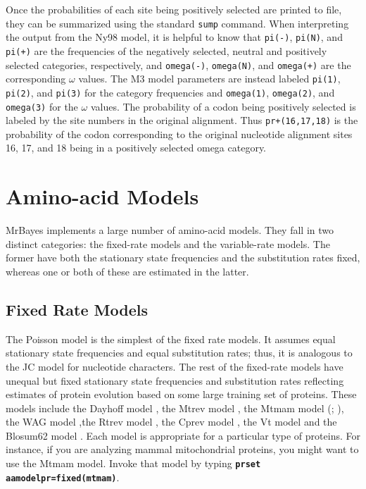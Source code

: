 \documentclass[12pt]{book}
\newcommand{\ttt}[1]{\texttt{#1}}
\newcommand{\tb}[1]{\ttt{\textbf{#1}}}
\begin{document}
Once the probabilities of each site being positively selected are printed to file, they can be
summarized using the standard \ttt{sump} command. When interpreting the output from the Ny98 model,
it is helpful to know that \ttt{pi(-)}, \ttt{pi(N)}, and \ttt{pi(+)} are the frequencies of the
negatively selected, neutral and positively selected categories, respectively, and \ttt{omega(-)},
\ttt{omega(N)}, and \ttt{omega(+)} are the corresponding $\omega$ values. The M3 model parameters
are instead labeled \ttt{pi(1)}, \ttt{pi(2)}, and \ttt{pi(3)} for the category frequencies and
\ttt{omega(1)}, \ttt{omega(2)}, and \ttt{omega(3)} for the $\omega$ values. The probability of a
codon being positively selected is labeled by the site numbers in the original alignment. Thus
\ttt{pr+(16,17,18)} is the probability of the codon corresponding to the original nucleotide
alignment sites 16, 17, and 18 being in a positively selected omega category.

\section{Amino-acid Models}
\label{amino-acidModels}

MrBayes implements a large number of amino-acid models. They fall in two distinct categories: the
fixed-rate models and the variable-rate models. The former have both the stationary state
frequencies and the substitution rates fixed, whereas one or both of these are estimated in the
latter.

\subsection{Fixed Rate Models}

The Poisson model \citep{bishop87} is the simplest of the fixed rate models. It assumes equal
stationary state frequencies and equal substitution rates; thus, it is analogous to the JC model
for nucleotide characters. The rest of the fixed-rate models have unequal but fixed stationary
state frequencies and substitution rates reflecting estimates of protein evolution based on some
large training set of proteins. These models include the Dayhoff model \citep{dayhoff78}, the Mtrev
model \citep{adachi96}, the Mtmam model (\citet{cao98}; \citet{yang98}), the WAG model
\citep{whelan01},the Rtrev model \citep{dimmic02}, the Cprev model \citep{adachi00}, the Vt model
\citep{muller00} and the Blosum62 model \citep{henikoff92}. Each model is appropriate for a
particular type of proteins. For instance, if you are analyzing mammal mitochondrial proteins, you
might want to use the Mtmam model. Invoke that model by typing \tb{prset aamodelpr=fixed(mtmam)}.
\end{document}
